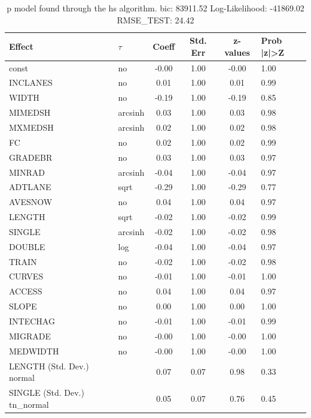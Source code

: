 \begin{table}
	\caption{p model found through the hs algorithm. bic: 83911.52 Log-Likelihood: -41869.02 RMSE_TEST: 24.42}
	\begin{center}
		\begin{tabular}{|l|l|c|c|c|l|}
			\hline
			Effect & $\tau$ & Coeff & Std. Err & z-values & Prob |z|>Z \\
			\hline
			const & no & -0.00 & 1.00 & -0.00 & 1.00 \\
			\hline
			INCLANES & no & 0.01 & 1.00 & 0.01 & 0.99 \\
			\hline
			WIDTH & no & -0.19 & 1.00 & -0.19 & 0.85 \\
			\hline
			MIMEDSH & arcsinh & 0.03 & 1.00 & 0.03 & 0.98 \\
			\hline
			MXMEDSH & arcsinh & 0.02 & 1.00 & 0.02 & 0.98 \\
			\hline
			FC & no & 0.02 & 1.00 & 0.02 & 0.99 \\
			\hline
			GRADEBR & no & 0.03 & 1.00 & 0.03 & 0.97 \\
			\hline
			MINRAD & arcsinh & -0.04 & 1.00 & -0.04 & 0.97 \\
			\hline
			ADTLANE & sqrt & -0.29 & 1.00 & -0.29 & 0.77 \\
			\hline
			AVESNOW & no & 0.04 & 1.00 & 0.04 & 0.97 \\
			\hline
			LENGTH & sqrt & -0.02 & 1.00 & -0.02 & 0.99 \\
			\hline
			SINGLE & arcsinh & -0.02 & 1.00 & -0.02 & 0.98 \\
			\hline
			DOUBLE & log & -0.04 & 1.00 & -0.04 & 0.97 \\
			\hline
			TRAIN & no & -0.02 & 1.00 & -0.02 & 0.98 \\
			\hline
			CURVES & no & -0.01 & 1.00 & -0.01 & 1.00 \\
			\hline
			ACCESS & no & 0.04 & 1.00 & 0.04 & 0.97 \\
			\hline
			SLOPE & no & 0.00 & 1.00 & 0.00 & 1.00 \\
			\hline
			INTECHAG & no & -0.01 & 1.00 & -0.01 & 0.99 \\
			\hline
			MIGRADE & no & -0.00 & 1.00 & -0.00 & 1.00 \\
			\hline
			MEDWIDTH & no & -0.00 & 1.00 & -0.00 & 1.00 \\
			\hline
			LENGTH (Std. Dev.) normal &  & 0.07 & 0.07 & 0.98 & 0.33 \\
			\hline
			SINGLE (Std. Dev.) tn_normal &  & 0.05 & 0.07 & 0.76 & 0.45 \\

\end{tabular}
\end{center}
\end{table}
